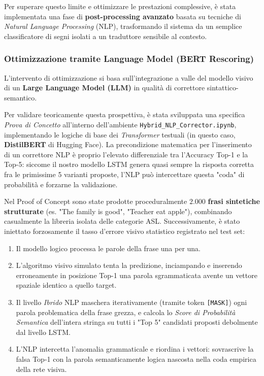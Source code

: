 Per superare questo limite e ottimizzare le prestazioni complessive, è stata implementata una fase di \textbf{post-processing avanzato} basata su tecniche di \textit{Natural Language Processing} (NLP), trasformando il sistema da un semplice classificatore di segni isolati a un traduttore sensibile al contesto.

\subsubsection{Ottimizzazione tramite Language Model (BERT Rescoring)}
L'intervento di ottimizzazione si basa sull'integrazione a valle del modello visivo di un \textbf{Large Language Model (LLM)} in qualità di correttore sintattico-semantico.

Per validare teoricamente questa prospettiva, è stata sviluppata una specifica \textit{Prova di Concetto} all'interno dell'ambiente \texttt{Hybrid\_NLP\_Corrector.ipynb}, implementando le logiche di base dei \textit{Transformer} testuali (in questo caso, \textbf{DistilBERT} di Hugging Face). 
La precondizione matematica per l'inserimento di un correttore NLP è proprio l'elevato differenziale tra l'Accuracy Top-1 e la Top-5: siccome il nostro modello LSTM genera quasi sempre la risposta corretta fra le primissime 5 varianti proposte, l'NLP può intercettare questa "coda" di probabilità e forzarne la validazione.

Nel Proof of Concept sono state prodotte proceduralmente $2.000$ \textbf{frasi sintetiche strutturate} (es. "The family is good", "Teacher eat apple"), combinando casualmente la libreria isolata delle categorie ASL. Successivamente, è stato iniettato forzosamente il tasso d'errore visivo statistico registrato nel test set:
\begin{enumerate}
    \item Il modello logico processa le parole della frase una per una. 
    \item L'algoritmo visivo simulato tenta la predizione, inciampando e inserendo erroneamente in posizione Top-1 una parola sgrammaticata avente un vettore spaziale identico a quello target.
    \item Il livello \textit{Ibrido} NLP maschera iterativamente (tramite token \texttt{[MASK]}) ogni parola problematica della frase grezza, e calcola lo \textit{Score di Probabilità Semantica} dell'intera stringa su tutti i "Top 5" candidati proposti debolmente dal livello LSTM.
    \item L'NLP intercetta l'anomalia grammaticale e riordina i vettori: sovrascrive la falsa Top-1 con la parola semanticamente logica nascosta nella coda empirica della rete visiva.
\end{enumerate}


